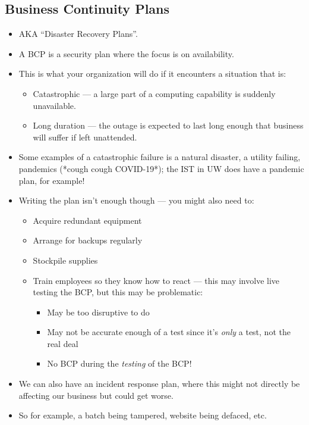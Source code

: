 \documentclass{article}
\begin{document}
\subsection{Business Continuity Plans}
\begin{itemize}
    \item AKA ``Disaster Recovery Plans''.
    \item A BCP is a security plan where the focus is on availability.
    \item This is what your organization will do if it encounters a situation that is:
        \begin{itemize}
            \item Catastrophic --- a large part of a computing capability is suddenly unavailable.
            \item Long duration --- the outage is expected to last long enough that business will suffer if left unattended.
        \end{itemize}
    \item Some examples of a catastrophic failure is a natural disaster, a utility failing, pandemics (*cough cough COVID-19*); the IST in UW does have a pandemic plan, for example!
    \item Writing the plan isn't enough though --- you might also need to:
        \begin{itemize}
            \item Acquire redundant equipment
            \item Arrange for backups regularly
            \item Stockpile supplies
            \item Train employees so they know how to react --- this may involve live testing the BCP, but this may be problematic:
                \begin{itemize}
                    \item May be too disruptive to do
                    \item May not be accurate enough of a test since it's \emph{only} a test, not the real deal
                    \item No BCP during the \emph{testing} of the BCP!
                \end{itemize}
        \end{itemize}
    \item We can also have an incident response plan, where this might not directly be affecting our business but could get worse.
    \item So for example, a batch being tampered, website being defaced, etc.

\end{itemize}
\end{document}
